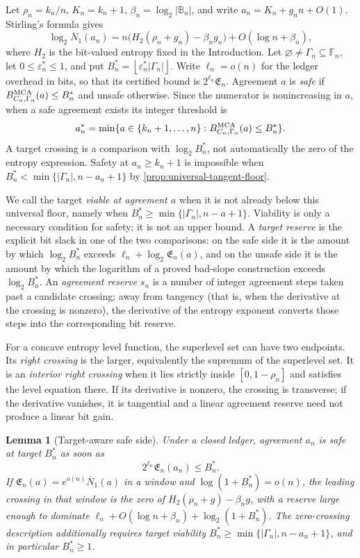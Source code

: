 \documentclass[12pt,a4paper]{amsart}
\numberwithin{equation}{section}
\newtheorem{lemma}[lemma]{Lemma}
\theoremstyle{remark}
\newcommand{\F}{\mathbb F}
\newcommand{\B}{\mathbb B}
\newcommand{\eps}{\varepsilon}
\newcommand{\barN}{\overline N}
\newcommand{\abs}[1]{\lvert #1\rvert}
\newcommand{\floor}[1]{\left\lfloor #1\right\rfloor}
\begin{document}
Let \(\rho_n=k_n/n\), \(K_n=k_n+1\),
\(\beta_n=\log_2\abs{\B_n}\), and write
\(a_n=K_n+g_nn+O(1)\).  Stirling's formula gives
\[
 \log_2\barN_1(a_n)
 =n\bigl(H_2(\rho_n+g_n)-\beta_ng_n\bigr)
  +O(\log n+\beta_n),
 \tag{13.1}\label{eq:target-entropy}
\]
where \(H_2\) is the bit-valued entropy fixed in the Introduction.  Let
\(\varnothing\ne\Gamma_n\subseteq\F_n\), let \(0\le\eps_n^*\le1\), and
put \(B_n^*=\floor{\eps_n^*\abs{\Gamma_n}}\).  Write \(\ell_n=o(n)\) for
the ledger overhead in bits, so that its certified bound is
\(2^{\ell_n}\mathfrak E_n\).  Agreement \(a\) is \emph{safe} if
\(B_{C_n,\Gamma_n}^{\rm MCA}(a)\le B_n^*\) and unsafe otherwise.  Since
the numerator is nonincreasing in \(a\), when a safe agreement exists its
integer threshold is
\[
 a_n^*=\min\{a\in\{k_n+1,\ldots,n\}:
 B_{C_n,\Gamma_n}^{\rm MCA}(a)\le B_n^*\}.
\]
A target crossing is a comparison with \(\log_2B_n^*\), not automatically
the zero of the entropy expression.  Safety at \(a_n\ge k_n+1\) is
impossible when
\(B_n^*<\min\{\abs{\Gamma_n},n-a_n+1\}\) by
\cref{prop:universal-tangent-floor}.

We call the target \emph{viable at agreement \(a\)} when it is not already
below this universal floor, namely when
\(B_n^*\ge\min\{\abs{\Gamma_n},n-a+1\}\).  Viability is only a necessary
condition for safety; it is not an upper bound.  A \emph{target reserve}
is the explicit bit slack in one of the two comparisons: on the safe side
it is the amount by which \(\log_2 B_n^*\) exceeds
\(\ell_n+\log_2\mathfrak E_n(a)\), and on the unsafe side it is the amount
by which the logarithm of a proved bad-slope construction exceeds
\(\log_2B_n^*\).  An \emph{agreement reserve} \(s_n\) is a number of
integer agreement steps taken past a candidate crossing; away from
tangency (that is, when the derivative at the crossing is nonzero), the
derivative of the entropy exponent converts those steps into
the corresponding bit reserve.

For a concave entropy level function, the superlevel set can have two
endpoints.  Its \emph{right crossing} is the larger, equivalently the
supremum of the superlevel set.  It is an \emph{interior right crossing}
when it lies strictly inside \([0,1-\rho_n]\) and satisfies the level
equation there.  If its derivative is nonzero, the crossing is transverse;
if the derivative vanishes, it is tangential and a linear agreement reserve
need not produce a linear bit gain.

\begin{lemma}[Target-aware safe side]\label{lem:safe-side}
Under a closed ledger, agreement \(a_n\) is safe at target \(B_n^*\) as
soon as
\[
        2^{\ell_n}\mathfrak E_n(a_n)\le B_n^*.
        \tag{13.2}\label{eq:exact-safe-budget}
\]
If \(\mathfrak E_n(a)=e^{o(n)}\barN_1(a)\) in a window and
\(\log(1+B_n^*)=o(n)\), the leading crossing in that window is the zero of
\(H_2(\rho_n+g)-\beta_ng\), with a reserve large enough to dominate
\(\ell_n+O(\log n+\beta_n)+\log_2(1+B_n^*)\).  The zero-crossing
description additionally requires target viability
\(B_n^*\ge\min\{\abs{\Gamma_n},n-a_n+1\}\), and in particular
\(B_n^*\ge1\).
\end{lemma}
\end{document}

